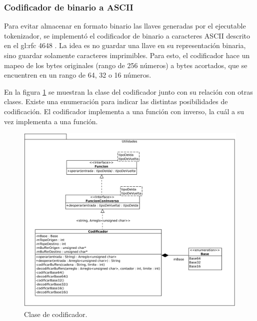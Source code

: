 % 
%
%

\subsubsection{Codificador de binario a ASCII}

Para evitar almacenar en formato binario las llaves generadas por el ejecutable 
tokenizador, se implementó el codificador de binario a caracteres ASCII descrito 
en el \gls{gl:rfc} 4648 \cite{DBLP:journals/rfc/rfc4648}. La idea es no guardar 
una llave en su representación binaria, sino guardar solamente caracteres
imprimibles. Para esto, el codificador hace un mapeo de los bytes originales
(rango de 256 números) a bytes acortados, que se encuentren en un rango de 64,
32 o 16 números. 

En la figura \ref{clases_codificador} se muestran la clase del codificador junto
con su relación con otras clases. Existe una enumeración para indicar las
distintas posibilidades de codificación. El codificador implementa a una función
con inverso, la cuál a su vez implementa a una función.

\begin{figure}
  \begin{center}
    \includegraphics[width=0.7\linewidth]{diagramas/codificador.png}
    \caption{Clase de codificador.}
    \label{clases_codificador}
  \end{center}
\end{figure}

